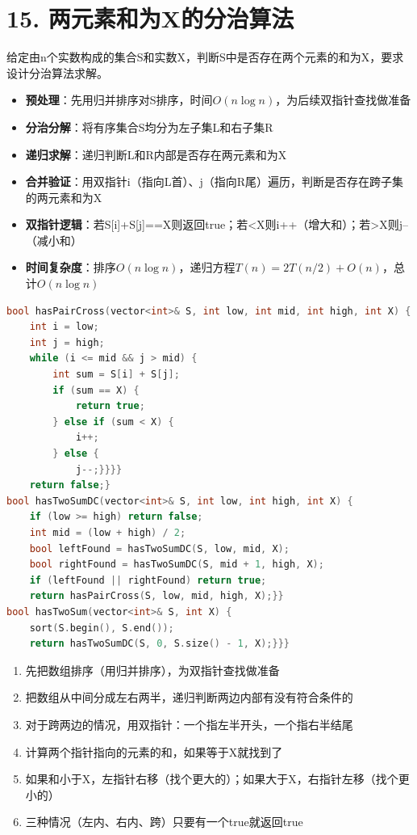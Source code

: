 \section*{15. 两元素和为X的分治算法}

给定由n个实数构成的集合S和实数X，判断S中是否存在两个元素的和为X，要求设计分治算法求解。

\begin{itemize}
    \item \textbf{预处理}：先用归并排序对S排序，时间$O(n\log n)$，为后续双指针查找做准备
    \item \textbf{分治分解}：将有序集合S均分为左子集L和右子集R
    \item \textbf{递归求解}：递归判断L和R内部是否存在两元素和为X
    \item \textbf{合并验证}：用双指针i（指向L首）、j（指向R尾）遍历，判断是否存在跨子集的两元素和为X
    \item \textbf{双指针逻辑}：若S[i]+S[j]==X则返回true；若<X则i++（增大和）；若>X则j--（减小和）
    \item \textbf{时间复杂度}：排序$O(n\log n)$，递归方程$T(n)=2T(n/2)+O(n)$，总计$O(n\log n)$
\end{itemize}

\begin{lstlisting}[language=C++, style=cppstyle]
bool hasPairCross(vector<int>& S, int low, int mid, int high, int X) {
    int i = low;
    int j = high;
    while (i <= mid && j > mid) {
        int sum = S[i] + S[j];
        if (sum == X) {
            return true;
        } else if (sum < X) {
            i++;
        } else {
            j--;}}}}
    return false;}
bool hasTwoSumDC(vector<int>& S, int low, int high, int X) {
    if (low >= high) return false;
    int mid = (low + high) / 2;
    bool leftFound = hasTwoSumDC(S, low, mid, X);
    bool rightFound = hasTwoSumDC(S, mid + 1, high, X);
    if (leftFound || rightFound) return true;
    return hasPairCross(S, low, mid, high, X);}}
bool hasTwoSum(vector<int>& S, int X) {
    sort(S.begin(), S.end());
    return hasTwoSumDC(S, 0, S.size() - 1, X);}}}
\end{lstlisting}

\begin{enumerate}
    \item 先把数组排序（用归并排序），为双指针查找做准备
    \item 把数组从中间分成左右两半，递归判断两边内部有没有符合条件的
    \item 对于跨两边的情况，用双指针：一个指左半开头，一个指右半结尾
    \item 计算两个指针指向的元素的和，如果等于X就找到了
    \item 如果和小于X，左指针右移（找个更大的）；如果大于X，右指针左移（找个更小的）
    \item 三种情况（左内、右内、跨）只要有一个true就返回true
\end{enumerate}
